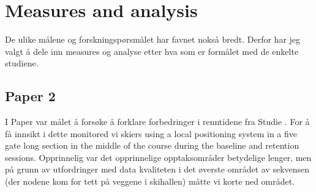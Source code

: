 





\section{Measures and analysis}
De ulike målene og forskningspørsmålet har favnet nokså bredt. Derfor har jeg valgt å dele inn measures og analyse etter hva som er formålet med de enkelte studiene. 


\subsection{Paper 2}
I Paper  var målet å forsøke å forklare forbedringer i renntidene fra Studie . For å få innsikt i dette monitored vi skiers using a local positioning system in a five gate long section in the middle of the course during the baseline and retention sessions. Opprinnelig var det opprinnelige opptaksområder betydelige lenger, men på grunn av utfordringer med data kvaliteten i det øverste området av sekvensen (der nodene kom for tett på veggene i skihallen) måtte vi korte ned området. 




